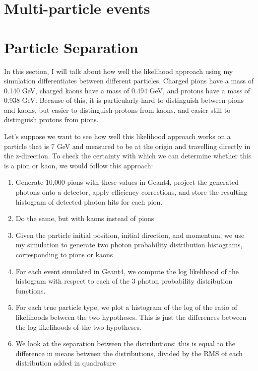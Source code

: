 
\section{Multi-particle events}


\section{Particle Separation}
In this section, I will talk about how well the likelihood approach using my simulation differentiates between different particles. 
Charged pions have a mass of  0.140 GeV, charged kaons have a mass of 0.494 GeV, and protons have a mass of 0.938 GeV.
Because of this, it is particularly hard to distinguish between pions and kaons, but easier to distinguish protons from kaons, and easier still to distinguish protons from pions.

Let's suppose we want to see how well this likelihood approach works on a particle that is 7 GeV and measured to be at the origin and travelling directly in the z-direction.
To check the certainty with which we can determine whether this is a pion or kaon, we would follow this approach:

\begin{enumerate}
\item Generate 10,000 pions with these values in Geant4, project the generated photons onto a detector, apply efficiency corrections, and store the resulting histogram of detected photon hits for each pion. 
\item Do the same, but with kaons instead of pions
\item Given the particle initial position, initial direction, and momentum, we use my simulation to generate two photon probability distribution histograms, corresponding to pions or kaons
\item For each event simulated in Geant4, we compute the log likelihood of the histogram with respect to each of the 3 photon probability distribution functions.
\item For each true particle type, we plot a histogram of the log of the ratio of likelihoods between the two hypotheses.
This is just the differences between the log-likelihoods of the two hypotheses.
\item We look at the separation between the distributions: this is equal to the difference in means between the distributions, divided by the RMS of each distribution added in quadrature
\end{enumerate}

